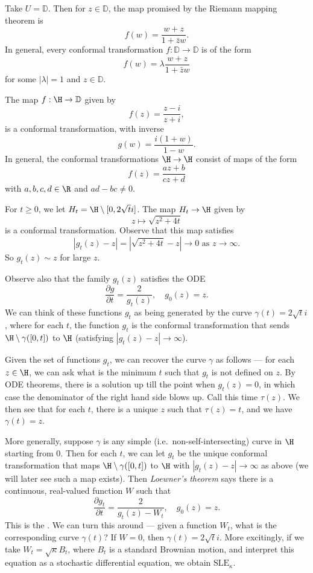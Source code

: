 \documentclass[a4paper]{article}
\renewcommand\D{\mathbb{D}}
\newcommand\SLE{\mathrm{SLE}}
\begin{document}
\begin{eg}
  Take $U = \D$. Then for $z \in \D$, the map promised by the Riemann mapping theorem is
  \[
    f(w) = \frac{w + z}{1 + \bar{z} w}.
  \]
  In general, every conformal transformation $f: \D \to \D$ is of the form
  \[
    f(w) = \lambda \frac{w + z}{1 + \bar{z}w}
  \]
  for some $|\lambda| = 1$ and $z \in \D$.
\end{eg}

\begin{eg}
  The map $f: \H \to \D$ given by
  \[
    f(z) = \frac{z - i}{z + i},
  \]
  is a conformal transformation, with inverse
  \[
    g(w) = \frac{i(1 + w)}{1 - w}.
  \]
  In general, the conformal transformations $\H \to \H$ consist of maps of the form
  \[
    f(z) = \frac{az + b}{c z + d}
  \]
  with $a, b, c, d \in \R$ and $ad - bc \not= 0$.
\end{eg}

\begin{eg}
  For $t \geq 0$, we let $H_t = \H \setminus [0, 2\sqrt{t} i]$. The map $H_t \to \H$ given by
  \[
    z \mapsto \sqrt{z^2 + 4t}
  \]
  is a conformal transformation. Observe that this map satisfies
  \[
    |g_t(z) - z| = |\sqrt{z^2 + 4t} - z| \to 0\text{ as } z \to \infty.
  \]
  So $g_t(z) \sim z$ for large $z$.

  Observe also that the family $g_t(z)$ satisfies the ODE
  \[
    \frac{\partial g}{\partial t} = \frac{2}{g_t(z)},\quad g_0(z) = z.
  \]
  We can think of these functions $g_t$ as being generated by the curve $\gamma(t) = 2 \sqrt{t}i$, where for each $t$, the function $g_t$ is the conformal transformation that sends $\H \setminus \gamma([0, t])$ to $\H$ (satisfying $|g_t(z) - z| \to \infty$).
  
  Given the set of functions $g_t$, we can recover the curve $\gamma$ as follows --- for each $z \in \H$, we can ask what is the minimum $t$ such that $g_t$ is not defined on $z$. By ODE theorems, there is a solution up till the point when $g_t(z) = 0$, in which case the denominator of the right hand side blows up. Call this time $\tau(z)$. We then see that for each $t$, there is a unique $z$ such that $\tau(z) = t$, and we have $\gamma(t) = z$.

  More generally, suppose $\gamma$ is any simple (i.e.\ non-self-intersecting) curve in $\H$ starting from $0$. Then for each $t$, we can let $g_t$ be the unique conformal transformation that maps $\H \setminus \gamma([0, t])$ to $\H$ with $|g_t(z) - z| \to \infty$ as above (we will later see such a map exists). Then \emph{Loewner's theorem} says there is a continuous, real-valued function $W$ such that
  \[
    \frac{\partial g_t}{\partial t} = \frac{2}{g_t(z) - W_t},\quad g_0(z) = z.
  \]
  This is the . We can turn this around --- given a function $W_t$, what is the corresponding curve $\gamma(t)$? If $W = 0$, then $\gamma(t) = 2\sqrt{t}i$. More excitingly, if we take $W_t = \sqrt{\kappa} B_t$, where $B_t$ is a standard Brownian motion, and interpret this equation as a stochastic differential equation, we obtain $\SLE_\kappa$.
\end{eg}
\end{document}
